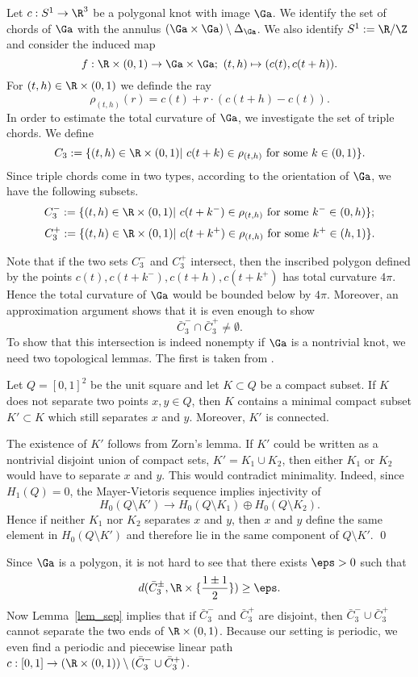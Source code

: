 Let $c:S^1\to\R^3$ be a polygonal knot with image $\Ga$.
We identify the set of chords of $\Ga$ with the annulus $(\Ga\times\Ga)\setminus\Delta_\Ga$.
We also identify $S^1:=\R/\Z$ and consider the induced map
\[f:\R\times(0,1)\to\Ga\times\Ga;\ (t,h)\mapsto(c(t),c(t+h)).\]
For $(t,h)\in\R\times(0,1)$ we definde the ray 
\[\rho_{(t,h)}(r)=c(t)+r\cdot(c(t+h)-c(t)).\]
In order to estimate the total curvature of $\Ga$, we investigate the set of triple chords. We define 
\[
C_3:=\{(t,h)\in\R\times(0,1)|\ c(t+k)\in\rho_{(t,h)} \text{ for some } k\in(0,1)\}.
\]
Since triple chords come in two types, according to the orientation of $\Ga$, we have the following subsets.
\[
C^-_3:=\{(t,h)\in\R\times(0,1)|\ c(t+k^-)\in\rho_{(t,h)} \text{ for some } k^-\in(0,h)\};
\]
\[
C^+_3:=\{(t,h)\in\R\times(0,1)|\ c(t+k^+)\in\rho_{(t,h)} \text{ for some } k^+\in(h,1)\}.
\]
 
Note that if the two sets $C_3^-$ and $C_3^+$ intersect, then the inscribed polygon defined by the points
$c(t),c(t+k^-),c(t+h),c(t+k^+)$ has total curvature $4\pi$. Hence the total curvature of $\Ga$ would be bounded below by $4\pi$.
 Moreover, an approximation argument shows that it is even enough to show  
\begin{equation*}
\tag{$\star$}\bar C_3^-\cap\bar C_3^+\neq\emptyset.
\end{equation*}
To show that this intersection is indeed nonempty if $\Ga$ is a nontrivial knot,
we need two topological lemmas. The first is taken from \cite{LWint}. 
 

\blem\label{lem_sep}
Let $Q=[0,1]^2$ be the unit square and let $K\subset Q$ be a compact subset.
If $K$ does not separate two points $x,y\in Q$, then $K$ contains a minimal compact subset $K'\subset K$
which still separates $x$ and $y$. Moreover, $K'$ is connected.
\elem

\proof
The existence of $K'$ follows from Zorn's lemma. If $K'$
could be written as a nontrivial disjoint union of compact sets, $K'=K_1\cup K_2$,
then either $K_1$ or $K_2$ would have to separate $x$ and $y$. This would contradict minimality.
Indeed, since $H_1(Q)=0$, the Mayer-Vietoris sequence implies injectivity of
\[H_0(Q \setminus K')\to H_0(Q \setminus K_1)\oplus H_0(Q \setminus K_2).\]
Hence if neither $K_1$ nor $K_2$ separates $x$ and $y$,
then $x$ and $y$ define the same element in $H_0(Q \setminus K')$
and therefore lie in the same component of $Q \setminus K'$.
\qed

Since $\Ga$ is a polygon, it is not hard to see that there exists $\eps>0$ 
such that 
\[d(\bar C_3^\pm,\R\times \{\frac{1\pm 1}{2}\})\geq\eps.\]
Now Lemma~\ref{lem_sep} implies that if $\bar C_3^-$ and $\bar C_3^+$
are disjoint, then $\bar C_3^-\cup\bar C_3^+$ cannot separate the two ends of $\R\times(0,1)$.
Because our setting is periodic, we even find a periodic and piecewise linear path $c:[0,1]\to(\R\times(0,1))\setminus (\bar C_3^-\cup\bar C_3^+)$.

